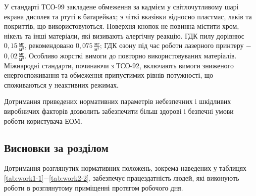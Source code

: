 У стандарті ТСО-99 закладене обмеження за кадмієм у світлочутливому шарі екрана дисплея та ртуті в батарейках; э чіткі вказівки відносно пластмас, лаків та покриттів, що використовуються. Поверхня кнопок не повинна містити хром, нікель та інші матеріали, які визивають алергічну реакцію. ГДК пилу дорівнює $0,15 \, \frac{\text{мг}}{\text{м}^{3}}$, рекомендовано $0,075 \, \frac{\text{мг}}{\text{м}^{3}}$; ГДК озону під час роботи   лазерного принтеру  $-$ $0,02 \, \frac{\text{мг}}{\text{м}^{3}}$. Особливо жорсткі вимоги до повторно використовуваних матеріалів. Міжнародні стандарти, починаючи з ТСО-92, включають вимоги зниженого енергоспоживання та обмеження припустимих рівнів потужності, що споживаються у неактивних режимах.

Дотримання приведених нормативних параметрів небезпечних і шкідливих виробничих факторів дозволить забезпечити більш здорові і безпечні умови роботи користувача ЕОМ.

\subsection{Висновки за розділом}

Дотримання розглянутих нормативних положень, зокрема наведених у таблицях \ref{tab:work1-1}$-$\ref{tab:work2-2}, забезпечує працездатність людей, які виконують роботи в розглянутому приміщенні протягом робочого дня.
